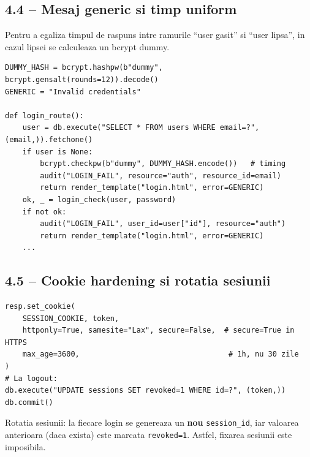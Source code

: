 \documentclass[12pt,a4paper]{article}
\begin{document}
\subsection{4.4 -- Mesaj generic si timp uniform}
Pentru a egaliza timpul de raspuns intre ramurile ``user gasit'' si
``user lipsa'', in cazul lipsei se calculeaza un bcrypt dummy.

\begin{lstlisting}[style=py, caption={Mesaj generic + dummy bcrypt}]
DUMMY_HASH = bcrypt.hashpw(b"dummy", bcrypt.gensalt(rounds=12)).decode()
GENERIC = "Invalid credentials"

def login_route():
    user = db.execute("SELECT * FROM users WHERE email=?", (email,)).fetchone()
    if user is None:
        bcrypt.checkpw(b"dummy", DUMMY_HASH.encode())   # timing
        audit("LOGIN_FAIL", resource="auth", resource_id=email)
        return render_template("login.html", error=GENERIC)
    ok, _ = login_check(user, password)
    if not ok:
        audit("LOGIN_FAIL", user_id=user["id"], resource="auth")
        return render_template("login.html", error=GENERIC)
    ...
\end{lstlisting}

\subsection{4.5 -- Cookie hardening si rotatia sesiunii}
\begin{lstlisting}[style=py, caption={Cookie hardening + revoke server-side}]
resp.set_cookie(
    SESSION_COOKIE, token,
    httponly=True, samesite="Lax", secure=False,  # secure=True in HTTPS
    max_age=3600,                                  # 1h, nu 30 zile
)
# La logout:
db.execute("UPDATE sessions SET revoked=1 WHERE id=?", (token,))
db.commit()
\end{lstlisting}
Rotatia sesiunii: la fiecare login se genereaza un \textbf{nou}
\texttt{session\_id}, iar valoarea anterioara (daca exista) este
marcata \texttt{revoked=1}. Astfel, fixarea sesiunii este imposibila.
\end{document}
